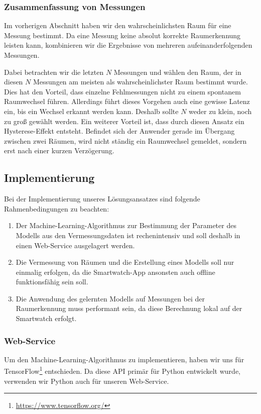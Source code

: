\subsubsection{Zusammenfassung von Messungen}
\label{sec:lok-zusammenfassung-messungen}

Im vorherigen Abschnitt haben wir den wahrscheinlichsten Raum für eine Messung bestimmt.
Da eine Messung keine absolut korrekte Raumerkennung leisten kann, kombinieren wir
die Ergebnisse von mehreren aufeinanderfolgenden Messungen.

Dabei betrachten wir die letzten $N$ Messungen und wählen den Raum, der in diesen
$N$ Messungen am meisten als wahrscheinlichster Raum bestimmt wurde.
Dies hat den Vorteil, dass einzelne Fehlmessungen nicht zu einem spontanem Raumwechsel
führen. Allerdings führt dieses Vorgehen auch eine gewisse Latenz ein, bis ein Wechsel
erkannt werden kann. Deshalb sollte $N$ weder zu klein, noch zu groß gewählt werden.
Ein weiterer Vorteil ist, dass durch diesen Ansatz ein Hysterese-Effekt entsteht.
Befindet sich der Anwender gerade im Übergang zwischen zwei Räumen, wird nicht ständig
ein Raumwechsel gemeldet, sondern erst nach einer kurzen Verzögerung.
  
\subsection{Implementierung}

Bei der Implementierung unseres Lösungsansatzes sind folgende Rahmenbedingungen zu beachten:
\begin{enumerate}
	\item Der Machine-Learning-Algorithmus zur Bestimmung der Parameter des Modells aus
		den Vermessungsdaten ist rechenintensiv und soll deshalb in einen Web-Service
		ausgelagert werden.
	\item Die Vermessung von Räumen und die Erstellung eines Modells soll nur einmalig
		erfolgen, da die Smartwatch-App ansonsten auch offline funktionsfähig sein soll.
	\item Die Anwendung des gelernten Modells auf Messungen bei der Raumerkennung muss
		performant sein, da diese Berechnung lokal auf der Smartwatch erfolgt.
\end{enumerate}

\subsubsection{Web-Service}

Um den Machine-Learning-Algorithmus zu implementieren, haben wir uns für
TensorFlow\footnote{\url{https://www.tensorflow.org/}} entschieden.
Da diese API primär für Python entwickelt wurde, verwenden wir Python auch
für unseren Web-Service.


